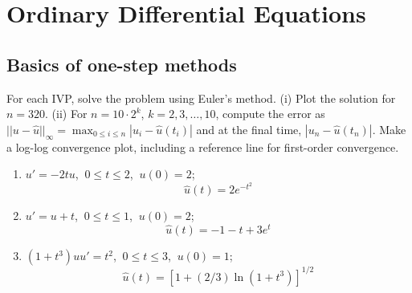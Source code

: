 \section{Ordinary Differential Equations}

\subsection{Basics of one-step methods}

\begin{exercise}
	For each IVP, solve the problem using Euler's method. (i) Plot the solution
	for $n=320$. (ii) For $n=10\cdot2^k$, $k=2,3,\ldots,10$, compute the error as
	$||u-\hat{u}||_\infty=\max_{0\leq i\leq n} |u_i-\hat{u}(t_i)|$ and at the final
	time, $|u_n-\hat{u}(t_n)|$. Make a log-log convergence plot, including a
	reference line for first-order convergence.
	\begin{enumerate}
		\item $u' = -2t u$, $\ 0 \le t \le 2$, $\ u(0) = 2$; \\
		      \[
			      \hat{u}(t) = 2e^{-t^2}
		      \]

		\item $u' = u + t$, $\ 0 \le t \le 1$, $\ u(0) = 2$; \\
		      \[
			      \hat{u}(t) = -1-t+3e^t
		      \]

		\item $(1+t^3)uu' = t^2$, $\ 0 \le t \le 3$, $\ u(0) =1$; \\
		      \[
			      \hat{u}(t) =[1+(2/3)\ln (1+t^3)]^{1/2}
		      \]
	\end{enumerate}
\end{exercise}

